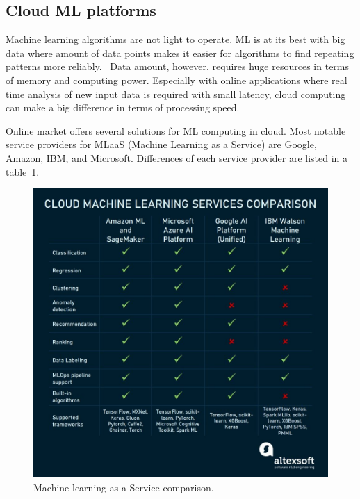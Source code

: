 
\subsection{Cloud ML platforms}\label{subsec:bg-cloud-ml-platforms}

Machine learning algorithms are not light to operate.
ML is at its best with big data
where amount of data points
makes it easier for algorithms
to find repeating patterns more reliably.~\cite{zhou2017machine}
Data amount, however,
requires huge resources in terms of memory and computing power.
Especially with online applications
where real time analysis of new input data is required
with small latency,
cloud computing can make a big difference
in terms of processing speed.

Online market offers several solutions for ML computing in cloud.
Most notable service providers for
MLaaS (Machine Learning as a Service)
are Google, Amazon, IBM, and Microsoft.
Differences of each service provider are listed in a table~\ref{fig:mlaas-comparison}.

\begin{figure}[htb]
    \centering
    \includegraphics[width=150mm]{./appendices/mlaas-comparison}
    \caption{Machine learning as a Service comparison.~\cite{altexsoft2021mlaas}
    \label{fig:mlaas-comparison}}
\end{figure}

